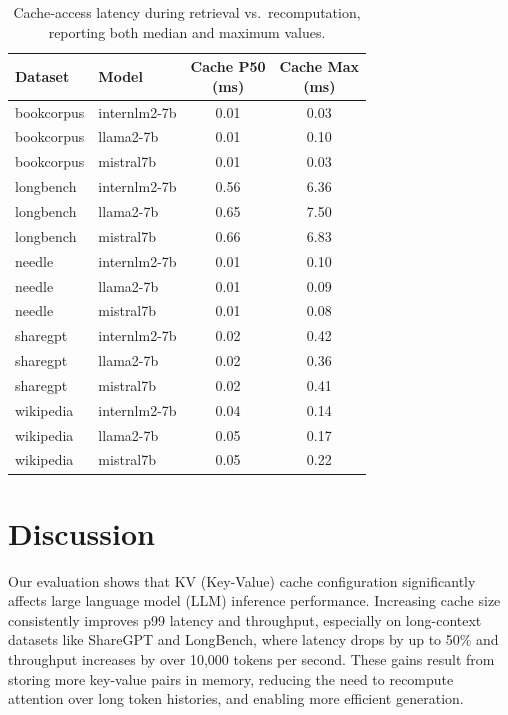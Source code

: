 \documentclass[sigconf,nonacm]{acmart}
\begin{document}
\begin{table}[ht]
  \centering
  \small
  \setlength{\tabcolsep}{3pt}
  \caption{Cache‐access latency during retrieval vs.\ recomputation, reporting both median and maximum values.}
  \label{tab:15}
  \begin{tabular}{
    >{\columncolor{gray!20}}l
    >{\columncolor{gray!20}}l
    >{\columncolor{gray!20}}c
    >{\columncolor{gray!20}}c
  }
    \toprule
    Dataset 
      & Model 
      & \makecell{Cache P50\\(ms)}
      & \makecell{Cache Max\\(ms)} \\
    \midrule
    bookcorpus & internlm2-7b & 0.01 & 0.03 \\
    bookcorpus & llama2-7b    & 0.01 & 0.10 \\
    bookcorpus & mistral7b    & 0.01 & 0.03 \\
    longbench  & internlm2-7b & 0.56 & 6.36 \\
    longbench  & llama2-7b    & 0.65 & 7.50 \\
    longbench  & mistral7b    & 0.66 & 6.83 \\
    needle     & internlm2-7b & 0.01 & 0.10 \\
    needle     & llama2-7b    & 0.01 & 0.09 \\
    needle     & mistral7b    & 0.01 & 0.08 \\
    sharegpt   & internlm2-7b & 0.02 & 0.42 \\
    sharegpt   & llama2-7b    & 0.02 & 0.36 \\
    sharegpt   & mistral7b    & 0.02 & 0.41 \\
    wikipedia  & internlm2-7b & 0.04 & 0.14 \\
    wikipedia  & llama2-7b    & 0.05 & 0.17 \\
    wikipedia  & mistral7b    & 0.05 & 0.22 \\
    \bottomrule
  \end{tabular}
\end{table}
 
\section {Discussion}

Our evaluation shows that KV (Key-Value) cache configuration significantly affects large language model (LLM) inference performance. Increasing cache size consistently improves p99 latency and throughput, especially on long-context datasets like ShareGPT and LongBench, where latency drops by up to 50\% and throughput increases by over 10,000 tokens per second. These gains result from storing more key-value pairs in memory, reducing the need to recompute attention over long token histories, and enabling more efficient generation.
\end{document}
